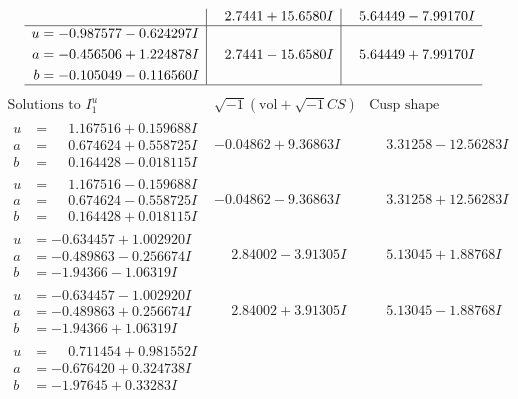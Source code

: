 \documentclass[1p]{elsarticle_modified}
\theoremstyle{definition}
\newcommand{\I}{\sqrt{-1}}
\begin{document}
$$\begin{array}{c|c|c}
 & \phantom{-}2.7441 + 15.6580 I & \phantom{-}5.64449 - 7.99170 I \\ \hline\begin{aligned}
u &= -0.987577 - 0.624297 I \\
a &= -0.456506 + 1.224878 I \\
b &= -0.105049 - 0.116560 I\end{aligned}
 & \phantom{-}2.7441 - 15.6580 I & \phantom{-}5.64449 + 7.99170 I\\
 \hline 
 \end{array}$$\newpage$$\begin{array}{c|c|c}  
\text{Solutions to }I^u_{1}& \I (\text{vol} + \sqrt{-1}CS) & \text{Cusp shape}\\
 \hline 
\begin{aligned}
u &= \phantom{-}1.167516 + 0.159688 I \\
a &= \phantom{-}0.674624 + 0.558725 I \\
b &= \phantom{-}0.164428 - 0.018115 I\end{aligned}
 & -0.04862 + 9.36863 I & \phantom{-}3.31258 - 12.56283 I \\ \hline\begin{aligned}
u &= \phantom{-}1.167516 - 0.159688 I \\
a &= \phantom{-}0.674624 - 0.558725 I \\
b &= \phantom{-}0.164428 + 0.018115 I\end{aligned}
 & -0.04862 - 9.36863 I & \phantom{-}3.31258 + 12.56283 I \\ \hline\begin{aligned}
u &= -0.634457 + 1.002920 I \\
a &= -0.489863 - 0.256674 I \\
b &= -1.94366 - 1.06319 I\end{aligned}
 & \phantom{-}2.84002 - 3.91305 I & \phantom{-}5.13045 + 1.88768 I \\ \hline\begin{aligned}
u &= -0.634457 - 1.002920 I \\
a &= -0.489863 + 0.256674 I \\
b &= -1.94366 + 1.06319 I\end{aligned}
 & \phantom{-}2.84002 + 3.91305 I & \phantom{-}5.13045 - 1.88768 I \\ \hline\begin{aligned}
u &= \phantom{-}0.711454 + 0.981552 I \\
a &= -0.676420 + 0.324738 I \\
b &= -1.97645 + 0.33283 I\end{aligned}

\end{array}$$
\end{document}
